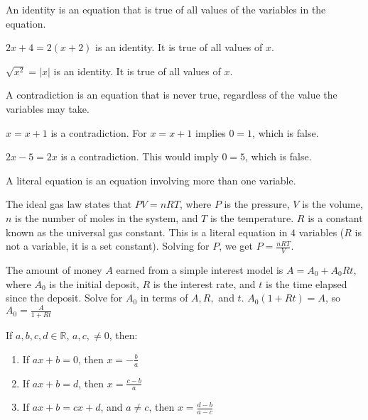 \documentclass[crop=false,class=book,oneside]{standalone}                      %
\begin{document}
        \begin{definition}
        An identity is an equation that is true of all values of the variables in the equation.
        \end{definition}
        \begin{example}
        $2x + 4 = 2(x+2)$ is an identity. It is true of all values of $x$.
        \end{example}
        \begin{example}
        $\sqrt{x^2}=|x|$ is an identity. It is true of all values of $x$.
        \end{example}
        \begin{definition}
        A contradiction is an equation that is never true, regardless of the value the variables may take.
        \end{definition}
        \begin{example}
        $x=x+1$ is a contradiction. For $x = x+1$ implies $0=1$, which is false.
        \end{example}
        \begin{example}
        $2x - 5 = 2x$ is a contradiction. This would imply $0=5$, which is false.
        \end{example}
        \begin{definition}
        A literal equation is an equation involving more than one variable.
        \end{definition}
        \begin{example}
        The ideal gas law states that $PV=nRT$, where $P$ is the pressure, $V$ is the volume, $n$ is the number of moles in the system, and $T$ is the temperature. $R$ is a constant known as the universal gas constant. This is a literal equation in $4$ variables ($R$ is not a variable, it is a set constant). Solving for $P$, we get $P = \frac{nRT}{V}$.
        \end{example}
        \begin{example}
        The amount of money $A$ earned from a simple interest model is $A = A_0+A_0Rt$, where $A_0$ is the initial deposit, $R$ is the
        interest rate, and $t$ is the time elapsed since the deposit. Solve for $A_0$ in terms of $A,R,$ and $t$.
        $A_{0}(1+Rt)=A$, so $A_{0}=\frac{A}{1+Rt}$
        \end{example}
        \begin{theorem}
        If $a,b,c,d\in \mathbb{R}$, $a,c, \ne 0$, then:
        \begin{enumerate}
        \item If $ax+b=0$, then $x=-\frac{b}{a}$
        \item If $ax+b=d$, then $x=\frac{c-b}{a}$
        \item If $ax+b=cx+d$, and $a\ne c$, then $x =\frac{d-b}{a-c}$
        \end{enumerate}
        \end{theorem}
\end{document}
